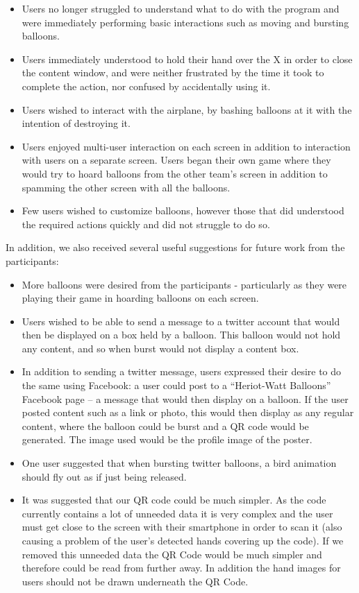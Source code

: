 \begin{itemize}
	\item Users no longer struggled to understand what to do with the program and were immediately performing basic interactions such as moving and bursting balloons.
	\item Users immediately understood to hold their hand over the X in order to close the content window, and were neither frustrated by the time it took to complete the action, nor confused by accidentally using it.
	\item Users wished to interact with the airplane, by bashing balloons at it with the intention of destroying it.
	\item Users enjoyed multi-user interaction on each screen in addition to interaction with users on a separate screen. Users began their own game where they would try to hoard balloons from the other team's screen in addition to spamming the other screen with all the balloons.
	\item Few users wished to customize balloons, however those that did understood the required actions quickly and did not struggle to do so.
\end{itemize}

In addition, we also received several useful suggestions for future work from the participants:

\begin{itemize}
	\item More balloons were desired from the participants - particularly as they were playing their game in hoarding balloons on each screen.
	\item Users wished to be able to send a message to a twitter account that would then be displayed on a box held by a balloon. This balloon would not hold any content, and so when burst would not display a content box.
	\item In addition to sending a twitter message, users expressed their desire to do the same using Facebook: a user could post to a ``Heriot-Watt Balloons'' Facebook page -- a message that would then display on a balloon. If the user posted content such as a link or photo, this would then display as any regular content, where the balloon could be burst and a QR code would be generated. The image used would be the profile image of the poster.
	\item One user suggested that when bursting twitter balloons, a bird animation should fly out as if just being released.
	\item It was suggested that our QR code could be much simpler. As the code currently contains a lot of unneeded data it is very complex and the user must get close to the screen with their smartphone in order to scan it (also causing a problem of the user's detected hands covering up the code). If we removed this unneeded data the QR Code would be much simpler and therefore could be read from further away. In addition the hand images for users should not be drawn underneath the QR Code. 
\end{itemize}


